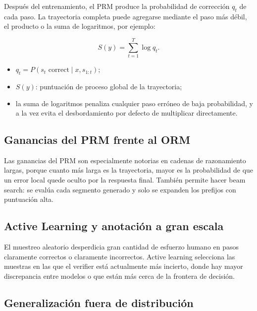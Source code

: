 Después del entrenamiento, el PRM produce la probabilidad de corrección $q_t$ de cada paso. La trayectoria completa puede agregarse mediante el paso más débil, el producto o la suma de logaritmos, por ejemplo:

$$
S(y)=\sum_{t=1}^{T}\log q_t.
$$

\begin{itemize}
    \item $q_t=P(s_t\text{ correct}\mid x,s_{1:t})$;
    \item $S(y)$: puntuación de proceso global de la trayectoria;
    \item la suma de logaritmos penaliza cualquier paso erróneo de baja probabilidad, y a la vez evita el desbordamiento por defecto de multiplicar directamente.
\end{itemize}

\subsection{Ganancias del PRM frente al ORM}


Las ganancias del PRM son especialmente notorias en cadenas de razonamiento largas, porque cuanto más larga es la trayectoria, mayor es la probabilidad de que un error local quede oculto por la respuesta final. También permite hacer beam search: se evalúa cada segmento generado y solo se expanden los prefijos con puntuación alta.

\subsection{Active Learning y anotación a gran escala}

El muestreo aleatorio desperdicia gran cantidad de esfuerzo humano en pasos claramente correctos o claramente incorrectos. Active learning selecciona las muestras en las que el verifier está actualmente más incierto, donde hay mayor discrepancia entre modelos o que están más cerca de la frontera de decisión.


\subsection{Generalización fuera de distribución}

